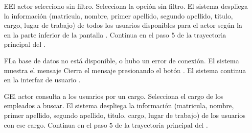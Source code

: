 
\begin{UCtrayectoriaA}{E}{El actor selecciono sin filtro.}
	\UCpaso[\UCactor] Selecciona la opción sin filtro.
	\UCpaso El sistema despliega la información (matricula,  nombre, primer apellido, segundo apellido, titulo, cargo, lugar de trabajo) de todos los usuarios disponibles para el actor según la   en la parte inferior de la pantalla .
	\UCpaso Continua en el paso 5 de la trayectoria principal del . 
\end{UCtrayectoriaA}

\begin{UCtrayectoriaA}{F}{La base de datos no está disponible, o hubo un error de conexión.}
	\UCpaso El sistema muestra el mensaje 
	\UCpaso[\UCactor] Cierra el mensaje presionando el botón .
	\UCpaso  El sistema continua en la interfaz de usuario .
\end{UCtrayectoriaA}

\begin{UCtrayectoriaA}{G}{El actor consulta a los usuarios por un cargo.}
	\UCpaso[\UCactor] Selecciona el cargo de los empleados a buscar.
	\UCpaso El sistema despliega la información (matricula,  nombre, primer apellido, segundo apellido, titulo, cargo, lugar de trabajo) de los usuarios con ese cargo.
	\UCpaso Continua en el paso 5 de la trayectoria principal del . 
\end{UCtrayectoriaA}





